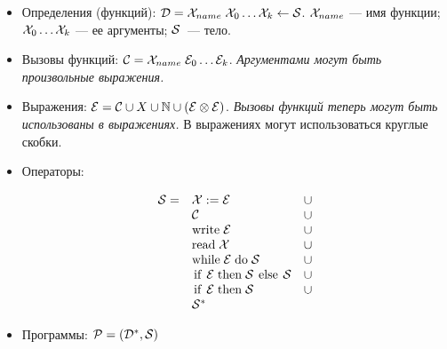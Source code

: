 \documentclass{article}
\newcommand{\fancy}[1]{{\cal{#1}}}
\newcommand{\llang}[1]{\mbox{\lstinline[mathescape]|#1|}}
\newcommand{\NN}{\mathbb N}
\begin{document}
\begin{itemize}

\item Определения (функций): $\fancy{D}=\fancy{X}_{name} \; \fancy{X}_0 \dots \fancy{X}_k \leftarrow \fancy{S}$. $\fancy{X}_{name}$ --- имя функции;  $\fancy{X}_0 \dots \fancy{X}_k$ --- ее аргументы; $\fancy{S}$~--- тело.
\item Вызовы функций: $\fancy{C} = \fancy{X}_{name} \; \fancy{E}_0 \dots \fancy{E}_k$. \emph{Аргументами могут быть произвольные выражения.}
\item Выражения: $\fancy{E}=\fancy{C} \cup X\cup\NN\cup(\fancy{E}\otimes\fancy{E})$. \emph{Вызовы функций теперь могут быть использованы в выражениях.} В выражениях могут использоваться круглые скобки.


\item Операторы: 

$$
\begin{array}{rll}
  \fancy{S}=
            &\fancy{X}\;\llang{:=}\;\fancy{E}&\cup\\
            &\fancy{C}&\cup\\
            &\llang{write}\;\fancy{E}&\cup\\
            &\llang{read}\;\fancy{X}&\cup\\
            &\llang{while}\;\fancy{E}\;\llang{do}\;\fancy{S}&\cup\\
            &\llang{if}\;\fancy{E}\;\llang{then}\;\fancy{S}\;\llang{else}\;\fancy{S}&\cup\\
            &\llang{if}\;\fancy{E}\;\llang{then}\;\fancy{S}&\cup\\
            &\fancy{S}^*
            
\end{array}
$$
\item Программы: $\fancy{P}=(\fancy{D}^*, \fancy{S})$
\end{itemize}
\end{document}

